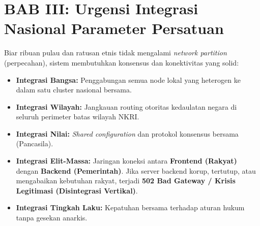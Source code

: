 \documentclass[10pt,a4paper]{article}
\begin{document}
\section*{BAB III: Urgensi Integrasi Nasional Parameter Persatuan}

\begin{analogibox}
Biar ribuan pulau dan ratusan etnis tidak mengalami \textit{network partition} (perpecahan), sistem membutuhkan konsensus dan konektivitas yang solid:
\begin{itemize}
  \item \textbf{Integrasi Bangsa:} Penggabungan semua node lokal yang heterogen ke dalam satu cluster nasional bersama.
  \item \textbf{Integrasi Wilayah:} Jangkauan routing otoritas kedaulatan negara di seluruh perimeter batas wilayah NKRI.
  \item \textbf{Integrasi Nilai:} \textit{Shared configuration} dan protokol konsensus bersama (Pancasila).
  \item \textbf{Integrasi Elit-Massa:} Jaringan koneksi antara \textbf{Frontend (Rakyat)} dengan \textbf{Backend (Pemerintah)}. Jika server backend korup, tertutup, atau mengabaikan kebutuhan rakyat, terjadi \textbf{502 Bad Gateway / Krisis Legitimasi (Disintegrasi Vertikal)}.
  \item \textbf{Integrasi Tingkah Laku:} Kepatuhan bersama terhadap aturan hukum tanpa gesekan anarkis.
\end{itemize}
\end{analogibox}
\end{document}
